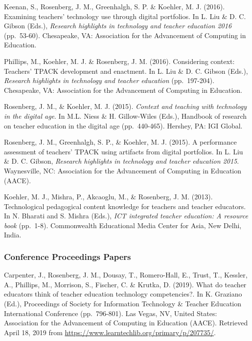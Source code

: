 \documentclass[14,]{article}
\begin{document}
Keenan, S., Rosenberg, J. M., Greenhalgh, S. P. \& Koehler, M. J.
(2016). Examining teachers' technology use through digital portfolios.
In L. Liu \& D. C. Gibson (Eds.), \emph{Research highlights in
technology and teacher education 2016} (pp.~53-60). Chesapeake, VA:
Association for the Advancement of Computing in Education.

Phillips, M., Koehler, M. J. \& Rosenberg, J. M. (2016). Considering
context: Teachers' TPACK development and enactment. In L. Liu \& D. C.
Gibson (Eds.), \emph{Research highlights in technology and teacher
education} (pp.~197-204). Chesapeake, VA: Association for the
Advancement of Computing in Education.

Rosenberg, J. M., \& Koehler, M. J. (2015). \emph{Context and teaching
with technology in the digital age}. In M.L. Niess \& H. Gillow-Wiles
(Eds.), Handbook of research on teacher education in the digital age
(pp.~440-465). Hershey, PA: IGI Global.

Rosenberg, J. M., Greenhalgh, S. P., \& Koehler, M. J. (2015). A
performance assessment of teachers' TPACK using artifacts from digital
portfolios. In L. Liu \& D. C. Gibson, \emph{Research highlights in
technology and teacher education 2015}. Waynesville, NC: Association for
the Advancement of Computing in Education (AACE).

Koehler, M. J., Mishra, P., Akcaoglu, M., \& Rosenberg, J. M. (2013).
Technological pedagogical content knowledge for teachers and teacher
educators. In N. Bharati and S. Mishra (Eds.), \emph{ICT integrated
teacher education: A resource book} (pp.~1-8). Commonwealth Educational
Media Center for Asia, New Delhi, India.

\subsubsection{Conference Proceedings
Papers}\label{conference-proceedings-papers}

Carpenter, J., Rosenberg, J. M., Dousay, T., Romero-Hall, E., Trust, T.,
Kessler, A., Phillips, M., Morrison, S., Fischer, C. \& Krutka, D.
(2019). What do teacher educators think of teacher education technology
competencies?. In K. Graziano (Ed.), Proceedings of Society for
Information Technology \& Teacher Education International Conference
(pp.~796-801). Las Vegas, NV, United States: Association for the
Advancement of Computing in Education (AACE). Retrieved April 18, 2019
from \url{https://www.learntechlib.org/primary/p/207735/}.
\end{document}
